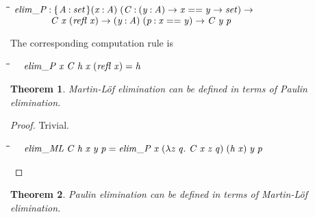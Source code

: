 \documentclass[11pt]{article}
\newlength{\lwidth}\setlength{\lwidth}{4.5cm}
\newlength{\cwidth}\setlength{\cwidth}{8mm} %
\newcommand{\Conid}[1]{\mathit{#1}}
\newcommand{\Varid}[1]{\mathit{#1}}
\newtheorem{theorem}{Theorem}[section]
\begin{document}
\begin{tabbing}
\qquad\=\hspace{\lwidth}\=\hspace{\cwidth}\=\+\kill
${\Varid{elim\char95 P}\mathbin{:}\{\mskip1.5mu \Conid{A}\mathbin{:}\Set\mskip1.5mu\}(\Varid{x}\mathbin{:}\Conid{A})\;(\Conid{C}\mathbin{:}(\Varid{y}\mathbin{:}\Conid{A})\to \Varid{x}==\Varid{y}\to \Set)\to }$\\
${\phantom{\Varid{elim\char95 P}\mathbin{:}\mbox{}}\Conid{C}\;\Varid{x}\;(\Varid{refl}\;\Varid{x})\to (\Varid{y}\mathbin{:}\Conid{A})\;(\Varid{p}\mathbin{:}\Varid{x}==\Varid{y})\to \Conid{C}\;\Varid{y}\;\Varid{p}}$
\end{tabbing}
The corresponding computation rule is
\begin{tabbing}
\qquad\=\hspace{\lwidth}\=\hspace{\cwidth}\=\+\kill
${\hskip1.00em\relax\Varid{elim\char95 P}\;\Varid{x}\;\Conid{C}\;\Varid{h}\;\Varid{x}\;(\Varid{refl}\;\Varid{x})\mathrel{=}\Varid{h}}$
\end{tabbing}\begin{theorem}
    Martin-Löf elimination can be defined in terms of Paulin elimination.
\end{theorem}

\begin{proof}

Trivial.
\begin{tabbing}
\qquad\=\hspace{\lwidth}\=\hspace{\cwidth}\=\+\kill
${\hskip1.00em\relax\Varid{elim\char95 ML}\;\Conid{C}\;\Varid{h}\;\Varid{x}\;\Varid{y}\;\Varid{p}\mathrel{=}\Varid{elim\char95 P}\;\Varid{x}\;(\lambda \Varid{z}\;\Varid{q}.~\Conid{C}\;\Varid{x}\;\Varid{z}\;\Varid{q})\;(\Varid{h}\;\Varid{x})\;\Varid{y}\;\Varid{p}}$
\end{tabbing}\end{proof}

\begin{theorem}
    Paulin elimination can be defined in terms of Martin-Löf elimination.
\end{theorem}
\end{document}

